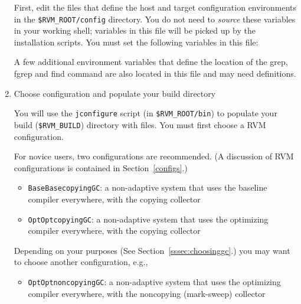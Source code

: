 \begin{enumerate}
First, edit the files that define the host and target configuration
environments in the {\tt \$RVM\_ROOT/config} directory.  You do not need to {\em
source} these variables in your working shell; variables in this file will be 
picked up by the installation scripts.  You must set the following
variables in this file:

A few additional environment variables that define the location of
the grep, fgrep and find command are also located in this file and
may need definitions.


\item Choose configuration and populate your build directory

You will use the {\tt jconfigure} script (in {\tt \$RVM\_ROOT/bin}) to
populate your build ({\tt \$RVM\_BUILD}) directory with files.  You must
first choose a RVM configuration.

For novice users, two configurations are recommended.  (A discussion
of RVM configurations is contained in Section~\ref{configs}.)

\begin{itemize}
\item {\tt BaseBasecopyingGC}: a non-adaptive system that uses the
baseline  compiler everywhere, with the copying collector
\item {\tt OptOptcopyingGC}: a non-adaptive system that uses the
optimizing compiler everywhere, with the copying collector
\end{itemize}

Depending on your purposes (See Section~\ref{sssec:choosinggc}.) you
may want to choose another configuration, e.g.,
\begin{itemize}
\item {\tt OptOptnoncopyingGC}: a non-adaptive system that uses the
optimizing  compiler everywhere, with the noncopying (mark-sweep) collector
\end{itemize}


\end{enumerate}
